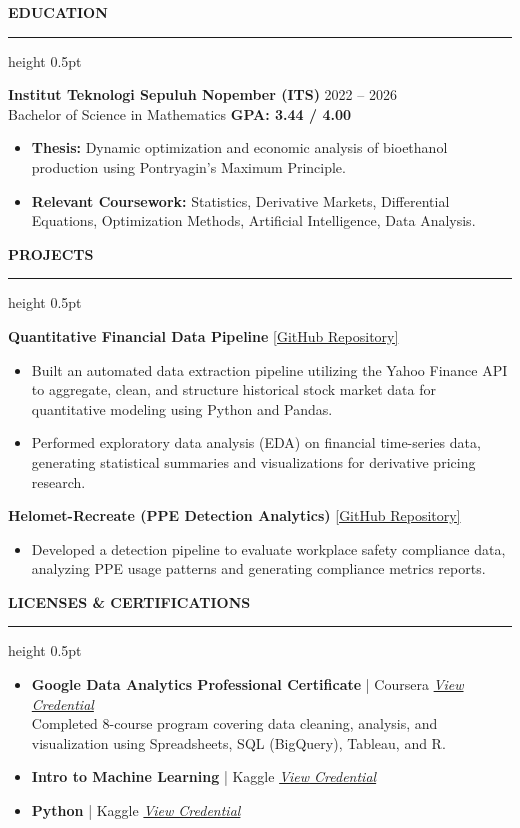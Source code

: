 \documentclass[11pt, letterpaper]{article}
\newcommand{\cvsection}[1]{%
    \vspace{0.8em}%
    {\large \textbf{\MakeUppercase{#1}}}%
    \vspace{0.2em}%
    \hrule height 0.5pt%
    \vspace{0.4em}%
}
\begin{document}
\cvsection{Education}
\textbf{Institut Teknologi Sepuluh Nopember (ITS)} \hfill 2022 -- 2026 \\
Bachelor of Science in Mathematics \hfill \textbf{GPA: 3.44 / 4.00}
\begin{itemize}[leftmargin=*, nosep]
    \item \textbf{Thesis:} Dynamic optimization and economic analysis of bioethanol production using Pontryagin's Maximum Principle.
    \item \textbf{Relevant Coursework:} Statistics, Derivative Markets, Differential Equations, Optimization Methods, Artificial Intelligence, Data Analysis.
\end{itemize}

\cvsection{Projects}
\textbf{Quantitative Financial Data Pipeline} \hfill \href{https://github.com/Edriczz/derivative_math.git}{[GitHub Repository]}
\begin{itemize}[leftmargin=*, nosep]
    \item Built an automated data extraction pipeline utilizing the Yahoo Finance API to aggregate, clean, and structure historical stock market data for quantitative modeling using Python and Pandas.
    \item Performed exploratory data analysis (EDA) on financial time-series data, generating statistical summaries and visualizations for derivative pricing research.
\end{itemize}

\textbf{Helomet-Recreate (PPE Detection Analytics)} \hfill \href{https://github.com/Edriczz/helomet-recreate.git}{[GitHub Repository]}
\begin{itemize}[leftmargin=*, nosep]
    \item Developed a detection pipeline to evaluate workplace safety compliance data, analyzing PPE usage patterns and generating compliance metrics reports.
\end{itemize}

\cvsection{Licenses \& Certifications}
\begin{itemize}[leftmargin=*, nosep]
    \item \textbf{Google Data Analytics Professional Certificate} | Coursera \hfill
        \href{https://www.coursera.org/account/accomplishments/professional-cert/certificate/V0X92BL0CM9Y}{\textit{View Credential}} \\
        Completed 8-course program covering data cleaning, analysis, and visualization using Spreadsheets, SQL (BigQuery), Tableau, and R.
    \item \textbf{Intro to Machine Learning} | Kaggle \hfill
        \href{https://www.kaggle.com/learn/certification/edricoseptianelyazar/intro-to-machine-learning}{\textit{View Credential}}
    \item \textbf{Python} | Kaggle \hfill
        \href{https://www.kaggle.com/learn/certification/edricoseptianelyazar/python}{\textit{View Credential}}
\end{itemize}
\end{document}

